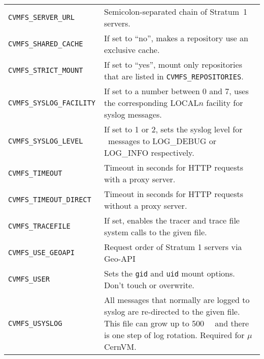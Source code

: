 \begin{longtable}{lX}
		\tt CVMFS\_SERVER\_URL				& Semicolon-separated chain of Stratum~1 servers.\\
		\tt CVMFS\_SHARED\_CACHE			& If set to ``no'', makes a repository use an exclusive cache.\\
		\tt CVMFS\_STRICT\_MOUNT			& If set to ``yes'', mount only repositories that are listed in \texttt{CVMFS\_REPOSITORIES}.\\
		\tt CVMFS\_SYSLOG\_FACILITY		& If set to a number between 0 and 7, uses the corresponding LOCAL$n$ facility for syslog messages.\\
		\tt CVMFS\_SYSLOG\_LEVEL			& If set to 1 or 2, sets the syslog level for \cvmfs\ messages to LOG\_DEBUG or LOG\_INFO respectively.\\
		\tt CVMFS\_TIMEOUT 				& Timeout in seconds for HTTP requests with a proxy server.\\
		\tt CVMFS\_TIMEOUT\_DIRECT 		& Timeout in seconds for HTTP requests without a proxy server.\\
		\tt CVMFS\_TRACEFILE				& If set, enables the tracer and trace file system calls to the given file.\\
		\tt CVMFS\_USE\_GEOAPI			& Request order of Stratum 1 servers via Geo-API\\
		\tt CVMFS\_USER					& Sets the \texttt{gid} and \texttt{uid} mount options. Don't touch or overwrite.\\
		\tt CVMFS\_USYSLOG				& All messages that normally are logged to syslog are re-directed to the given file.  This file can grow up to \SI{500}{\kilo\byte} and there is one step of log rotation.  Required for $\mu$CernVM.\\
		\bottomrule
	\end{longtable}
